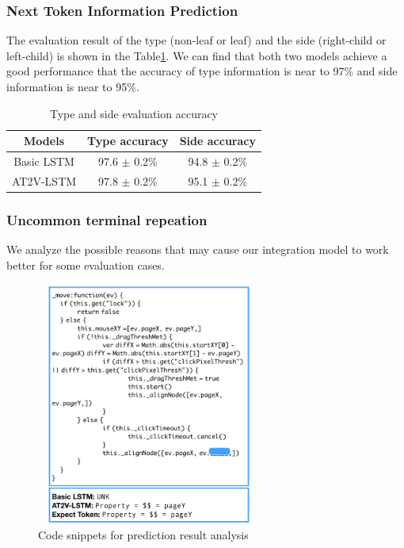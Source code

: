 \documentclass[E]{compsoft}
\begin{document}
\subsubsection{Next Token Information Prediction}
The evaluation result of the type (non-leaf or leaf) and the side (right-child or left-child) is shown in the Table\ref{table:node-information-evaluation-accuracy}.
We can find that both two models achieve a good performance that the accuracy of type information is near to 97\% and side information is near to 95\%. 


\begin{table}
\centering
\begin{tabular}{ccc}
\hline
Models& Type accuracy& Side accuracy\\
\hline
Basic LSTM& 97.6 $\pm$ 0.2\% & 94.8 $\pm$ 0.2\% \\
AT2V-LSTM& 97.8 $\pm$ 0.2\% & 95.1 $\pm$ 0.2\% \\
\hline
\end{tabular}
\caption{Type and side evaluation accuracy}
\label{table:node-information-evaluation-accuracy}
\end{table}

\subsubsection{Uncommon terminal repeation}
We analyze the possible reasons that may cause our integration model to work better for some evaluation cases. 

\begin{figure}[!ht]
\centering
\includegraphics[height=8cm, width=7.4cm]{pictures/code_snippets_compare.png}
\caption{Code snippets for prediction result analysis}
\label{fig:code_snippets_compare}
\end{figure}
\end{document}
